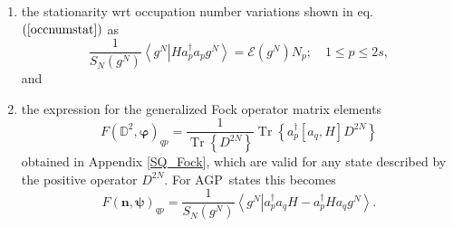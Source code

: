 \documentclass[aps,preprint]{revtex4}%
\begin{document}
\begin{enumerate}
\item the stationarity wrt occupation number variations shown in eq. $\left(
\ref{occnumstat}\right)  $ as
\begin{equation}
\frac{1}{S_{N}\left(  g^{N}\right)  }\left\langle \left.  g^{N}\right\vert
Ha_{p}^{\dagger}a_{p}g^{N}\right\rangle =\mathcal{E}\left(  g^{N}\right)
N_{p};\quad1\leq p\leq2s,
\end{equation}
and

\item the expression for the generalized Fock operator matrix elements
\begin{equation}
F\left(  \mathbb{D}^{2},\mathbf{\varphi}\right)  _{qp}=\frac{1}%
{\operatorname{Tr}\left\{  D^{2N}\right\}  }\operatorname{Tr}\left\{
a_{p}^{\dagger}\left[  a_{q},H\right]  D^{2N}\right\}
\end{equation}
obtained in Appendix \ref{SQ_Fock}, which are valid for any state described by
the positive operator $D^{2N}$. For AGP\ states this becomes
\begin{equation}
F\left(  \mathbf{n},\mathbf{\psi}\right)  _{qp}=\frac{1}{S_{N}\left(
g^{N}\right)  }\left\langle \left.  g^{N}\right\vert a_{p}^{\dagger}%
a_{q}H-a_{p}^{\dagger}Ha_{q}g^{N}\right\rangle .
\end{equation}

\end{enumerate}
\end{document}

